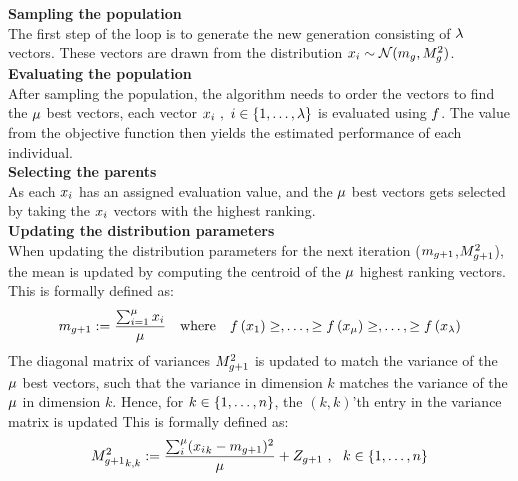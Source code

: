 \textbf{Sampling the population}\\
The first step of the loop is to generate the new generation 
consisting of $\lambda$ vectors. 
These vectors are drawn from the distribution 
$x_{i}\sim \mathcal{N}(m_{g},M^2_{g})$.
\\

\textbf{Evaluating the population}\\
After sampling the population, the algorithm needs to order the vectors to find the $\mu$ best vectors, each vector $x_{i}\ ,\ i \in \{1, \dots, \lambda\}$ is evaluated using $f$. 
The value from the objective function then yields 
the estimated performance of each individual.
\\

\textbf{Selecting the parents}\\
As each $x_{i}$ has an assigned evaluation value, and the 
$\mu$ best vectors gets selected by 
taking the $x_{i}$ vectors with the highest ranking.
\\

\textbf{Updating the distribution parameters}\\
When updating the distribution parameters for the next iteration
($m_{g + 1}$,$M^2_{g + 1}$), 
the mean is updated by computing the centroid of the 
$\mu$ highest ranking vectors. This is formally defined as:
\begin{align*}
\mean_{\generation +1}:=\frac{\sum_{i=1}^{\offspringNumber} \individual_{i}}{\offspringNumber}
\ \ \ 
\text{where}
\ \ \ 
\fitnessFunction \left( \individual_{1} \right) \geq, \dots, 
\geq \fitnessFunction \left( \individual_{\offspringNumber} \right) \geq, 
\dots, \geq \fitnessFunction \left( \individual_{\populationSize} \right)
\end{align*}
The diagonal matrix of variances $M^2_{g + 1}$ is updated 
to match the variance of the $\mu$ best
vectors, such that the variance in dimension $k$ 
matches the variance of the $\mu$
in dimension $k$. Hence, for $k \in \{ 1,\dots,n \}$,
the $(k,k)$'th entry in the variance matrix is 
updated 
This is formally defined as:
\begin{align*}
{M^2_{g+1}}_{k,k}:=\frac{\sum_{i}^{\mu}
({x_{i}}_k - m_{g +1})^2}{\mu} + 
Z_{g + 1}\ ,\ \ k \in \{ 1,\dots,n \}
\end{align*}
\\